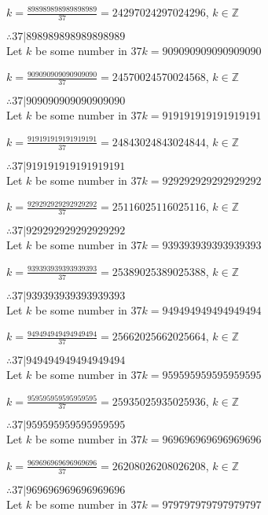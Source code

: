 \documentclass{article}
\begin{document}
$k = \frac{898989898989898989}{37} = 24297024297024296$, $k \in \mathbb{Z}$

$ \therefore  37|898989898989898989 $ \\

Let $k$ be some number in $37k = 909090909090909090$

$k = \frac{909090909090909090}{37} = 24570024570024568$, $k \in \mathbb{Z}$

$ \therefore  37|909090909090909090 $ \\

Let $k$ be some number in $37k = 919191919191919191$

$k = \frac{919191919191919191}{37} = 24843024843024844$, $k \in \mathbb{Z}$

$ \therefore  37|919191919191919191 $ \\

Let $k$ be some number in $37k = 929292929292929292$

$k = \frac{929292929292929292}{37} = 25116025116025116$, $k \in \mathbb{Z}$

$ \therefore  37|929292929292929292 $ \\

Let $k$ be some number in $37k = 939393939393939393$

$k = \frac{939393939393939393}{37} = 25389025389025388$, $k \in \mathbb{Z}$

$ \therefore  37|939393939393939393 $ \\

Let $k$ be some number in $37k = 949494949494949494$

$k = \frac{949494949494949494}{37} = 25662025662025664$, $k \in \mathbb{Z}$

$ \therefore  37|949494949494949494 $ \\

Let $k$ be some number in $37k = 959595959595959595$

$k = \frac{959595959595959595}{37} = 25935025935025936$, $k \in \mathbb{Z}$

$ \therefore  37|959595959595959595 $ \\

Let $k$ be some number in $37k = 969696969696969696$

$k = \frac{969696969696969696}{37} = 26208026208026208$, $k \in \mathbb{Z}$

$ \therefore  37|969696969696969696 $ \\

Let $k$ be some number in $37k = 979797979797979797$
\end{document}
